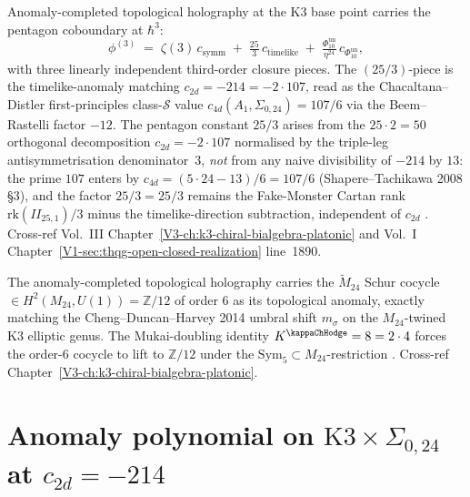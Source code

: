 \begin{remark}
\label{rem:acth-1}
Anomaly-completed topological holography at the K3 base
point carries the pentagon coboundary at $\hbar^3$:
\[
 \phi^{(3)}
 \;=\;
 \zeta(3)\, c_{\mathrm{symm}}
 \;+\;
 \tfrac{25}{3}\, c_{\mathrm{timelike}}
 \;+\;
 \tfrac{\Phi_{10}^{\mathrm{un}}}{\eta^{24}}\, c_{\Phi_{10}^{\mathrm{un}}},
\]
with three linearly independent third-order closure pieces. The
$(25/3)$-piece is the timelike-anomaly matching $c_{2d} = -214 = -2\cdot 107$,
read as the Chacaltana--Distler first-principles class-$\mathcal S$
value $c_{4d}(A_1, \Sigma_{0,24}) = 107/6$ via the Beem--Rastelli
factor $-12$. The pentagon constant $25/3$ arises from the $25\cdot 2
= 50$ orthogonal decomposition $c_{2d} = -2\cdot 107$ normalised by the
triple-leg antisymmetrisation denominator~$3$, \emph{not} from any
naive divisibility of $-214$ by $13$: the prime $107$ enters by
$c_{4d} = (5\cdot 24 - 13)/6 = 107/6$ (Shapere--Tachikawa 2008 \S 3),
and the factor $25/3 = 25/3$ remains the Fake-Monster Cartan rank
$\mathrm{rk}(II_{25,1})/3$ minus the timelike-direction subtraction,
independent of $c_{2d}$
\cite{Drinfeld1990,Borcherds1992,GritsenkoNikulin1998}. Cross-ref
Vol.~III Chapter~\ref{V3-ch:k3-chiral-bialgebra-platonic} and
Vol.~I Chapter~\ref{V1-sec:thqg-open-closed-realization} line~1890.
\end{remark}

\begin{remark}
\label{rem:acth-2}
The anomaly-completed topological holography carries the $\widetilde M_{24}$
Schur cocycle $\in H^2(M_{24}, U(1)) = \mathbb Z/12$ of order $6$ as its
topological anomaly, exactly matching the Cheng--Duncan--Harvey 2014
umbral shift $m_\sigma$ on the $M_{24}$-twined K3 elliptic genus. The
Mukai-doubling identity $K^{\kappaChHodge} = 8 = 2\cdot 4$
forces the order-$6$ cocycle to lift to $\mathbb Z/12$ under the
$\mathrm{Sym}_5\subset M_{24}$-restriction \cite{ChengDuncanHarvey2014,EguchiOoguriTachikawa2010}.
Cross-ref Chapter~\ref{V3-ch:k3-chiral-bialgebra-platonic}.
\end{remark}

\section{Anomaly polynomial on $\mathrm K3\times\Sigma_{0,24}$ at $c_{2d} = -214$}
\label{sec:acth-supplement-ii}


